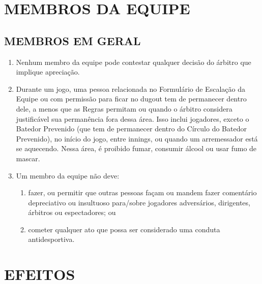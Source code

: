\section{MEMBROS DA EQUIPE}
\subsection{MEMBROS EM GERAL}
\begin{enumerate}[label=(\alph*)]
	\item Nenhum membro da equipe pode contestar qualquer decisão do árbitro que implique apreciação.
	\item Durante um jogo, uma pessoa relacionada no Formulário de Escalação da Equipe ou com permissão para ficar no \gls{dugout} tem de permanecer dentro dele, a menos que as Regras permitam ou quando o árbitro considera justificável sua  permanência fora dessa área. Isso inclui jogadores, exceto o Batedor Prevenido (que tem de permanecer dentro do Círculo do Batedor Prevenido), no início do jogo, entre \glspl{inning}, ou quando um arremessador está se aquecendo. Nessa área, é proibido fumar, consumir álcool ou usar fumo de mascar.
 	\item Um membro da equipe não deve:
	\begin{enumerate}[label=\roman*.]
		\item fazer, ou permitir que outras pessoas façam ou mandem fazer comentário depreciativo ou insultuoso para/sobre jogadores adversários, dirigentes, árbitros  ou espectadores; ou
		\item cometer qualquer ato que possa ser considerado uma conduta antidesportiva.
	\end{enumerate}
\end{enumerate}

\section*{EFEITOS}

